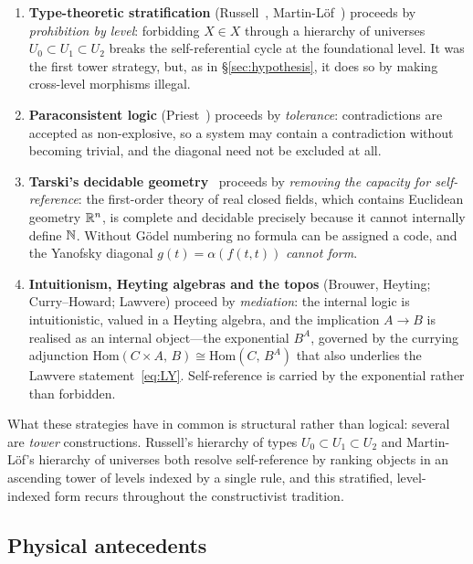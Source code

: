 \begin{enumerate}
\item \textbf{Type-theoretic stratification} (Russell~\cite{russell08}, Martin-L\"of~\cite{martinlof75}) proceeds by
\emph{prohibition by level}: forbidding $X\in X$ through a hierarchy of universes $U_0\subset U_1\subset U_2$ breaks
the self-referential cycle at the foundational level. It was the first tower strategy, but, as in
\S\ref{sec:hypothesis}, it does so by making cross-level morphisms illegal.
\item \textbf{Paraconsistent logic} (Priest~\cite{priest79}) proceeds by \emph{tolerance}: contradictions are
accepted as non-explosive, so a system may contain a contradiction without becoming trivial, and the diagonal need
not be excluded at all.
\item \textbf{Tarski's decidable geometry}~\cite{tarski52} proceeds by \emph{removing the capacity for
self-reference}: the first-order theory of real closed fields, which contains Euclidean geometry $\mathbb{R}^n$, is
complete and decidable precisely because it cannot internally define $\mathbb{N}$. Without G\"odel numbering no formula can
be assigned a code, and the Yanofsky diagonal $g(t)=\alpha(f(t,t))$ \emph{cannot form}.
\item \textbf{Intuitionism, Heyting algebras and the topos} (Brouwer, Heyting; Curry--Howard; Lawvere) proceed by
\emph{mediation}: the internal logic is intuitionistic, valued in a Heyting algebra, and the implication $A\to B$ is
realised as an internal object---the exponential $B^A$, governed by the currying adjunction
$\mathrm{Hom}(C\times A,\,B)\cong\mathrm{Hom}(C,\,B^A)$ that also underlies the Lawvere statement~\eqref{eq:LY}.
Self-reference is carried by the exponential rather than forbidden.
\end{enumerate}

What these strategies have in common is structural rather than logical: several are \emph{tower} constructions.
Russell's hierarchy of types $U_0\subset U_1\subset U_2$ and Martin-L\"of's hierarchy of universes both resolve
self-reference by ranking objects in an ascending tower of levels indexed by a single rule, and this stratified,
level-indexed form recurs throughout the constructivist tradition.

\subsection{Physical antecedents}\label{sec:phys}

